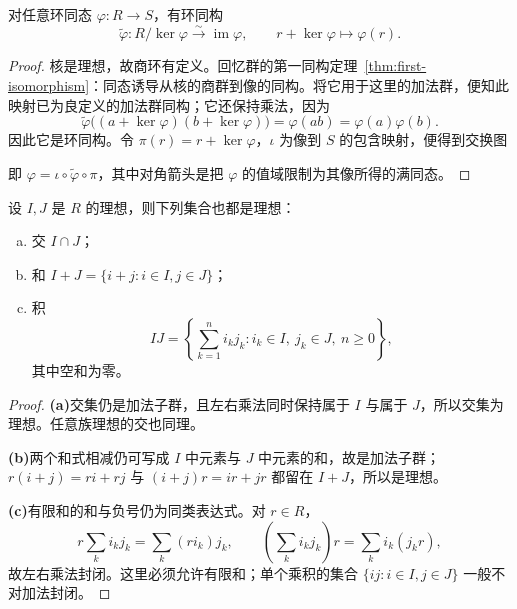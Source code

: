 \documentclass[lang=cn,a4paper,fontset=none,zihao=false,10pt,openany,twoside]{beautybook}
\numberwithin{algorithm}{chapter}
\begin{document}
\begin{theorem}[环的第一同构定理]\label{thm:ring-first-isomorphism}
对任意环同态 $\varphi:R\to S$，有环同构
\[
 \widetilde\varphi:R/\ker\varphi\xrightarrow{\sim}\operatorname{im}\varphi,
 \qquad r+\ker\varphi\longmapsto\varphi(r).
\]
\end{theorem}
\begin{proof}
核是理想，故商环有定义。回忆群的第一同构定理~\ref{thm:first-isomorphism}：同态诱导从核的商群到像的同构。将它用于这里的加法群，便知此映射已为良定义的加法群同构；它还保持乘法，因为
\[
 \widetilde\varphi\bigl((a+\ker\varphi)(b+\ker\varphi)\bigr)
 =\varphi(ab)=\varphi(a)\varphi(b).
\]
因此它是环同构。令 $\pi(r)=r+\ker\varphi$，$\iota$ 为像到 $S$ 的包含映射，便得到交换图
\begin{center}
\end{center}
即 $\varphi=\iota\circ\widetilde\varphi\circ\pi$，其中对角箭头是把 $\varphi$ 的值域限制为其像所得的满同态。
\end{proof}

\begin{example}
设 $I,J$ 是 $R$ 的理想，则下列集合也都是理想：
\begin{enumerate}[(a)]
\item 交 $I\cap J$；
\item 和 $I+J=\{i+j:i\in I,j\in J\}$；
\item 积
\[
 IJ=\left\{\sum_{k=1}^n i_kj_k:i_k\in I,\ j_k\in J,\ n\ge0\right\},
\]
其中空和为零。
\end{enumerate}
\end{example}
\begin{proof}
\par\smallskip\noindent\textbf{(a)}\quad 交集仍是加法子群，且左右乘法同时保持属于 $I$ 与属于 $J$，所以交集为理想。任意族理想的交也同理。
\par\smallskip\noindent\textbf{(b)}\quad 两个和式相减仍可写成 $I$ 中元素与 $J$ 中元素的和，故是加法子群；$r(i+j)=ri+rj$ 与 $(i+j)r=ir+jr$ 都留在 $I+J$，所以是理想。
\par\smallskip\noindent\textbf{(c)}\quad 有限和的和与负号仍为同类表达式。对 $r\in R$，
\[
 r\sum_k i_kj_k=\sum_k(ri_k)j_k,\qquad
 \left(\sum_k i_kj_k\right)r=\sum_k i_k(j_kr),
\]
故左右乘法封闭。这里必须允许有限和；单个乘积的集合 $\{ij:i\in I,j\in J\}$ 一般不对加法封闭。
\end{proof}
\end{document}
